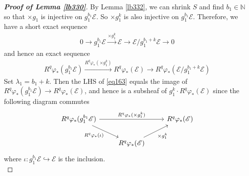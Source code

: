 \documentclass[12pt,b5paper,notitlepage]{report}
\theoremstyle{definition}
\theoremstyle{plain}
\newcommand{\scr}{\mathscr}
\newcommand{\Nbb}{\mathbb N}
\numberwithin{equation}{section}
\begin{document}
\begin{proof}[\textbf{Proof of Lemma \ref{lb330}}]
By Lemma \ref{lb332}, we can shrink $S$ and find $b_1\in\Nbb$ so that $\times g_1$ is injective on $g_1^{b_1}\scr E$. So $\times g_1^k$ is also injective on $g_1^{b_1}\scr E$. Therefore, we have a short exact sequence
\begin{align}
0\rightarrow g_1^{b_1}\scr E\xrightarrow{\times g_1^k} \scr E\rightarrow \scr E/ g_1^{b_1+k}\scr E\rightarrow0   \label{eq165}
\end{align}
and hence an exact sequence
\begin{align*}
R^q\varphi_*(g_1^{b_1}\scr E)\xrightarrow{R^q\varphi_*(\times g_1^k)} R^q\varphi_*(\scr E)\rightarrow R^q\varphi_*(\scr E/g_1^{b_1+k}\scr E)
\end{align*}
Set $\lambda_1=b_1+k$. Then the LHS of \eqref{eq163} equals the image of $R^q\varphi_*(g_1^{b_1}\scr E)\rightarrow R^q\varphi_*(\scr E)$, and hence is a subsheaf of $g_1^k\cdot R^q\varphi_*(\scr E)$ since the following diagram commutes
\begin{equation*}
\begin{tikzcd}
R^q\varphi_*(g_1^{b_1}\scr E) \arrow[rr,"R^q\varphi_*(\times g_1^k)"] \arrow[rd,"R^q\varphi_*(\iota)"'] &              & R^q\varphi_*(\scr E) \\
                        & R^q\varphi_*(\scr E) \arrow[ru, "\times g_1^k"'] &  
\end{tikzcd}
\end{equation*}
where $\iota:g_1^{b_1}\scr E\hookrightarrow\scr E$ is the inclusion.\\



\end{proof}
\end{document}
